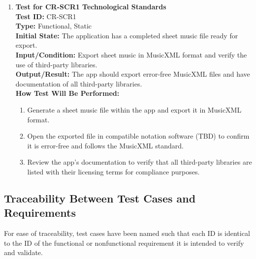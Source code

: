 \documentclass[12pt, titlepage]{article}
\begin{document}
\begin{enumerate}
    \item \textbf{Test for CR-SCR1 Technological Standards} \\
      \newline
      \textbf{Test ID:} CR-SCR1 \\
      \textbf{Type:} Functional, Static \\
      \textbf{Initial State:} The application has a completed sheet music file ready for export. \\
      \textbf{Input/Condition:} Export sheet music in MusicXML format and verify the use of third-party libraries. \\
      \textbf{Output/Result:} The app should export error-free MusicXML files and have documentation of all third-party libraries. \\
      \textbf{How Test Will Be Performed:}
      \begin{enumerate}
          \item Generate a sheet music file within the app and export it in MusicXML format.
          \item Open the exported file in compatible notation software (TBD) to confirm it is error-free and follows the MusicXML standard.
          \item Review the app’s documentation to verify that all third-party libraries are listed with their licensing terms for compliance purposes.
      \end{enumerate}
\end{enumerate}

\subsection{Traceability Between Test Cases and Requirements}

For ease of traceability, test cases have been named such that each ID is identical to the ID of 
the functional or nonfunctional requirement it is intended to verify and validate. 
  
\end{document}

